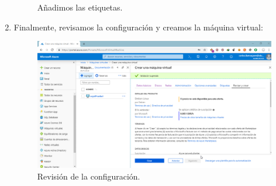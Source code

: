 \begin{enumerate}
\begin{figure}[h]
		\caption{Añadimos las etiquetas.}
		\label{Añadimos las etiqutas2}
	\end{figure}
\newpage
	\item Finalmente, revisamos la configuración y creamos la máquina virtual:
	\begin{figure}[h]
		\centering
		\includegraphics[scale=0.35]{ImagenesAzure/10.png}
		\caption{Revisión de la configuración.}
		\label{Revisión de la configuración}
	\end{figure}
\end{enumerate}